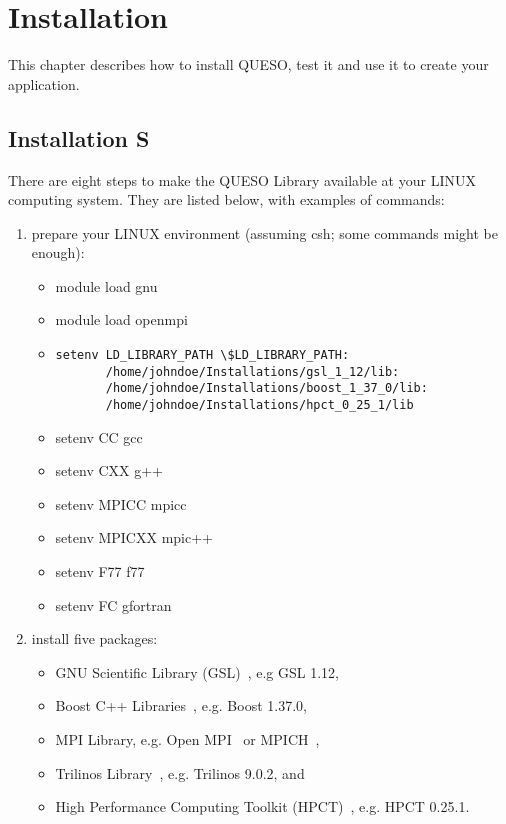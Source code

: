 \chapter{Installation}\label{ch-install}
\thispagestyle{headings}

This chapter describes how to install QUESO, test it and use it to create your application.

\section{Installation S}

There are eight steps to make the QUESO Library available at your LINUX computing system.
They are listed below, with examples of commands:
%
\begin{enumerate}
\item {prepare your LINUX environment (assuming csh; some commands might be enough): %
\begin{itemize}
\item module load gnu
\item module load openmpi
\item {
\begin{verbatim}
setenv LD_LIBRARY_PATH \$LD_LIBRARY_PATH:
       /home/johndoe/Installations/gsl_1_12/lib:
       /home/johndoe/Installations/boost_1_37_0/lib:
       /home/johndoe/Installations/hpct_0_25_1/lib
\end{verbatim}
}
\item setenv CC gcc
\item setenv CXX g++
\item setenv MPICC mpicc
\item setenv MPICXX mpic++
\item setenv F77 f77
\item setenv FC gfortran
\end{itemize}
}
\item {install five packages: %
\begin{itemize}
\item GNU Scientific Library (GSL)~\cite{Gsl}, e.g GSL 1.12,
\item Boost C++ Libraries~\cite{Boost}, e.g. Boost 1.37.0,
\item MPI Library, e.g. Open MPI~\cite{Openmpi} or MPICH~\cite{Mpich},
\item Trilinos Library~\cite{Trilinos}, e.g. Trilinos 9.0.2, and
\item {High Performance Computing Toolkit (HPCT)~\cite{Hpct}, e.g. HPCT 0.25.1.
}
\end{itemize}}
\end{enumerate}
